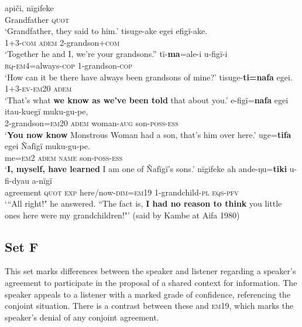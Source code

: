 \documentclass[output=paper]{langsci/langscibook}
\begin{document}
\begin{exe}
\ex \label{ex:eb49}
	\begin{xlist}
	\ex \label{ex:eb49a}
	\gll apiči, nïgifeke\\
	Grandfather \textsc{quot}\\
	\trans ‘Grandfather, they said to him.’
	\ex \label{ex:eb49b}
	\gll tisuge-ake egei efigï-ake.\\
	1+3-\textsc{com} \textsc{adem} 2-grandson+\textsc{com}\\
	\trans ‘Together he and I, we’re your grandsons.”
	\ex \label{ex:eb49c}
	\gll tï-\textbf{ma}=ale-i u-figï-i\\
	\textsc{rq-em4}=always-\textsc{cop} 1-grandson-\textsc{cop}\\
	\trans ‘How can it be there have always been grandsons of mine?’
	\ex \label{ex:eb49d}
	\gll tisuge-\textbf{ti=nafa} egei.\\
	1+3-\textsc{ev-em20} \textsc{adem}\\
	\trans ‘That’s what \textbf{we know as we’ve been told} that about you.’
	\ex \label{ex:eb49e}
	\gll e-figï=\textbf{nafa} egei itau-kuegï muku-gu-pe,\\
	2-grandson=\textsc{em20} \textsc{adem} woman-\textsc{aug} son-\textsc{poss-ess}\\
	\trans ‘\textbf{You now know} Monstrous Woman had a son, that’s him over here.’
	\ex \label{ex:eb49f}
	\gll uge=\textbf{tifa} egei Ñafïgï muku-gu-pe.\\
	me=\textsc{em2} \textsc{adem} \textsc{name} son-\textsc{poss-ess}\\
	\trans ‘\textbf{I, myself, have learned} I am one of Ñafïgï’s sons.’
	\ex \label{ex:eb49g}
	 nïgifeke ah ande-ŋu=\textbf{tiki} u-fi-dyau a-nïgï\\
	agreement \textsc{quot} \textsc{exp} here/now-\textsc{dim=em19} 1-grandchild-\textsc{pl} \textsc{eqs-pfv}\\
	\trans `“All right!" he answered. “The fact is, \textbf{I had no reason to think} you little ones here were my grandchildren!"' (said by Kambe at Aifa 1980)
\end{xlist}
\end{exe}


\subsection{Set F}

This set marks differences between the speaker and listener regarding a speaker’s agreement to participate in the proposal of a shared context for information.   The speaker appeals to a listener with a marked grade of confidence,  referencing the conjoint situation.  There is a contrast between these and \textsc{em}19, which marks the speaker’s denial of any conjoint agreement.
\end{document}
